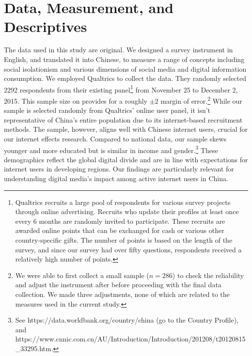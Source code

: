 \documentclass[]{interact}
\theoremstyle{plain}%
\theoremstyle{definition}
\theoremstyle{remark}
\begin{document}
\hypertarget{data-measurement-and-descriptives}{%
\section{Data, Measurement, and
Descriptives}\label{data-measurement-and-descriptives}}

The data used in this study are original. We designed a survey
instrument in English, and translated it into Chinese, to measure a
range of concepts including social isolationism and various dimensions
of social media and digital information consumption. We employed
Qualtrics to collect the data. They randomly selected 2292 respondents
from their existing panel\footnote{Qualtrics recruits a large pool of
  respondents for various survey projects through online advertising.
  Recruits who update their profiles at least once every 6 months are
  randomly invited to participate. These recruits are awarded online
  points that can be exchanged for cash or various other
  country-specific gifts. The number of points is based on the length of
  the survey, and since our survey had over fifty questions, respondents
  received a relatively high number of points.} from November 25 to
December 2, 2015. This sample size on provides for a roughly \(\pm2\)
margin of error.\footnote{We were able to first collect a small sample
  (\(n=286\)) to check the reliability and adjust the instrument after
  before proceeding with the final data collection. We made three
  adjustments, none of which are related to the measures used in the
  current study.} While our sample is selected randomly from Qualtrics'
online user panel, it isn't representative of China's entire population
due to its internet-based recruitment methods. The sample, however,
aligns well with Chinese internet users, crucial for our internet
effects research. Compared to national data, our sample skews younger
and more educated but is similar in income and gender.\footnote{See
  https://data.worldbank.org/country/china (go to the Country Profile),
  and
  https://www.cnnic.com.cn/AU/Introduction/Introduction/201208/t20120815\_33295.htm.}
These demographics reflect the global digital divide and are in line
with expectations for internet users in developing regions. Our findings
are particularly relevant for understanding digital media's impact among
active internet users in China.
\end{document}
